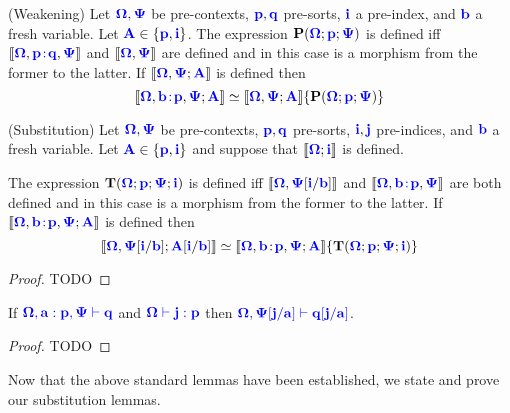 \documentclass[sigplan,10pt,review,anonymous]{acmart}
\newcommand{\blum}[1]{\mathbf{\color{blue}{#1}}}
\newcommand{\sem}[1]{\llbracket #1 \rrbracket}
\newcommand{\mbf}[1]{\mathbf{#1}}
\begin{document}
\begin{lemma}
(Weakening) Let $\blum{\Omega},\blum{\Psi}$ be pre-contexts, $\blum{p},\blum{q}$ pre-sorts, $\blum{i}$ a pre-index, and $\blum{b}$ a fresh variable. Let $\blum{A} \in \{ \blum{p}, \blum{i} \}$. The expression $\mbf{P}(\blum{\Omega} ; \blum{p} ; \blum{\Psi})$ is defined iff $\sem{\blum{\Omega}, \blum{p \! : \! q}, \blum{\Psi}}$ and $\sem{\blum{\Omega}, \blum{\Psi}}$ are defined and in this case is a morphism from the former to the latter. If $\sem{\blum{\Omega},\blum{\Psi} ; \blum{A}}$ is defined then 
$$\sem{\blum{\Omega}, \blum{b \! : \! p}, \blum{\Psi} ; \blum{A}} \simeq \sem{\blum{\Omega} , \blum{\Psi} ; \blum{A}} \{ \mbf{P}(\blum{\Omega}; \blum{p} ; \blum{\Psi}) \}$$
\end{lemma}

\begin{lemma}
\label{lemma:indsortsub}
(Substitution) Let $\blum{\Omega},\blum{\Psi}$ be pre-contexts, $\blum{p},\blum{q}$ pre-sorts, $\blum{i}, \blum{j}$ pre-indices, and $\blum{b}$ a fresh variable. Let $\blum{A} \in \{ \blum{p}, \blum{i} \}$ and suppose that $\sem{\blum{\Omega} ; \blum{i}}$ is defined. 

The expression $\mbf{T}(\blum{\Omega};\blum{p};\blum{\Psi};\blum{i})$ is defined iff $\sem{\blum{\Omega}, \blum{\Psi}[\blum{i}/\blum{b}]}$ and $\sem{\blum{\Omega} , \blum{b \! : \! p}, \blum{\Psi}}$ are both defined and in this case is a morphism from the former to the latter. If $\sem{\blum{\Omega},\blum{b \! : \! p},\blum{\Psi} ; \blum{A}}$ is defined then 
$$\sem{\blum{\Omega},\blum{\Psi}[\blum{i}/\blum{b}]; \blum{A}[\blum{i}/\blum{b}]} \simeq \sem{\blum{\Omega},\blum{b} \! : \! \blum{p},\blum{\Psi};\blum{A}} \{ \mbf{T}(\blum{\Omega} ; \blum{p} ; \blum{\Psi} ; \blum{i}) \}$$
\end{lemma}

\begin{proof}
TODO
\end{proof}

\begin{lemma}
\label{lemma:indsortsub-syntax}
If $\blum{\Omega, a:p,\Psi \vdash q}$ and $\blum{\Omega \vdash j : p}$ then $\blum{\Omega, \Psi[j/a] \vdash q[j/a]}$.
\end{lemma}

\begin{proof}
TODO
\end{proof}

Now that the above standard lemmas have been established, we state and prove our substitution lemmas.
\end{document}

